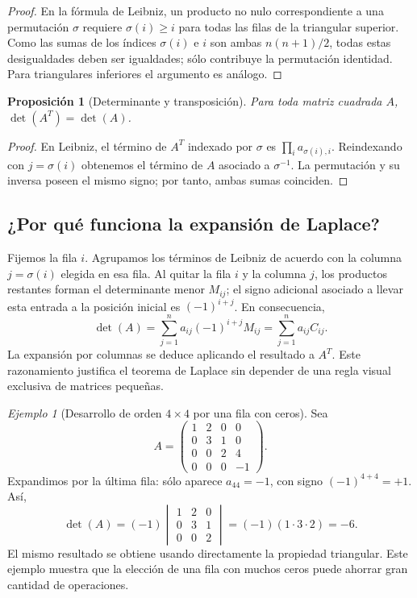\documentclass[12pt]{article}
\newtheorem{proposicion}[definicion]{Proposición}
\theoremstyle{remark}
\newtheorem{ejemplo}[definicion]{Ejemplo}
\begin{document}
\begin{proof}
En la fórmula de Leibniz, un producto no nulo correspondiente a una permutación $\sigma$ requiere $\sigma(i)\ge i$ para todas las filas de la triangular superior. Como las sumas de los índices $\sigma(i)$ e $i$ son ambas $n(n+1)/2$, todas estas desigualdades deben ser igualdades; sólo contribuye la permutación identidad. Para triangulares inferiores el argumento es análogo.
\end{proof}
\begin{proposicion}[Determinante y transposición]
Para toda matriz cuadrada $A$, $\det(A^T)=\det(A)$.
\end{proposicion}
\begin{proof}
En Leibniz, el término de $A^T$ indexado por $\sigma$ es $\prod_i a_{\sigma(i),i}$. Reindexando con $j=\sigma(i)$ obtenemos el término de $A$ asociado a $\sigma^{-1}$. La permutación y su inversa poseen el mismo signo; por tanto, ambas sumas coinciden.
\end{proof}

\subsection{¿Por qué funciona la expansión de Laplace?}
Fijemos la fila $i$. Agrupamos los términos de Leibniz de acuerdo con la columna $j=\sigma(i)$ elegida en esa fila. Al quitar la fila $i$ y la columna $j$, los productos restantes forman el determinante menor $M_{ij}$; el signo adicional asociado a llevar esta entrada a la posición inicial es $(-1)^{i+j}$. En consecuencia,
\[
\det(A)=\sum_{j=1}^na_{ij}(-1)^{i+j}M_{ij}=
\sum_{j=1}^na_{ij}C_{ij}.
\]
La expansión por columnas se deduce aplicando el resultado a $A^T$. Este razonamiento justifica el teorema de Laplace sin depender de una regla visual exclusiva de matrices pequeñas.

\begin{ejemplo}[Desarrollo de orden $4\times4$ por una fila con ceros]
Sea
\[
A=\begin{pmatrix}1&2&0&0\\0&3&1&0\\0&0&2&4\\0&0&0&-1\end{pmatrix}.
\]
Expandimos por la última fila: sólo aparece $a_{44}=-1$, con signo $(-1)^{4+4}=+1$. Así,
\[
\det(A)=(-1)\begin{vmatrix}1&2&0\\0&3&1\\0&0&2\end{vmatrix}
=(-1)(1\cdot3\cdot2)=\boxed{-6}.
\]
El mismo resultado se obtiene usando directamente la propiedad triangular. Este ejemplo muestra que la elección de una fila con muchos ceros puede ahorrar gran cantidad de operaciones.
\end{ejemplo}
\end{document}

